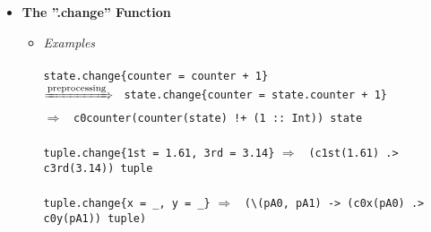 \documentclass{article}
\def\H{Haskell}
\def\lra{$\Longrightarrow$\ }
\def\prarr{$\xRightarrow{\text{preprocessing}}$\ }
\begin{document}
\begin{itemize}
\begin{itemize}
\item
\textit{Description}\\\\
Postfix functions are projection functions that are generated automatically by
the translation of the relevant \verb|tuple_type| defintion or they are the
projection functions for product types (\verb|_.1st _.2nd etc|). They are
translated into regular \H\ functions (like the record accessor functions of
\H\ are) with their argument in parenthesis. For \verb|_.1st _.2nd etc| a 'p'
for "projection" is prepended to make it a valid \H\ function.
\\\\
The projection functions for product types are polymorphic and work on tuples
of any size (in principle, for size $\leq$ 5 for now). This is achieved by
making them polymorphic through the following class (for p1st and similar
classes for the rest):
\begin{verbatim}
class IsFirst' a b | b -> a where
  p1st :: b -> a
\end{verbatim}
And the following instances:

\begin{verbatim}
instance IsFirst' a (a, b) where
  p1st = fst

instance IsFirst' a (a, b, c) where
  p1st = \(a, _, _) -> a

instance IsFirst' a (a, b, c, d) where
  p1st = \(a, _, _, _) -> a

...
\end{verbatim}
\end{itemize}

\item
\textbf{The ”.change” Function}

\begin{itemize}
\item
\textit{Examples}\\\\
\texttt{state.change\{counter = counter + 1\}}\\
\prarr
\texttt{state.change\{counter = state.counter + 1\}}\\
\lra
\verb|c0counter(counter(state) !+ (1 :: Int)) state|
\\\\
\texttt{tuple.change\{1st = 1.61, 3rd = 3.14\}} \lra
\texttt{(c1st(1.61) .> c3rd(3.14)) tuple}
\\\\
\verb|tuple.change{x = _, y = _}| \lra
\verb|(\(pA0, pA1) -> (c0x(pA0) .> c0y(pA1)) tuple)| \\


\end{itemize}
\end{itemize}
\end{document}
